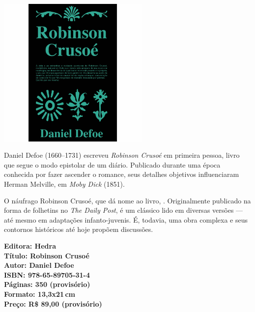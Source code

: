 \begin{center}
\hspace*{.5cm}\includegraphics[width=74mm]{./CAPAS/HEDRA_ROBINSON.jpg}
\end{center}
\hspace*{-7cm}\hrulefill\hspace*{-7cm}
\medskip

\noindent{}Daniel Defoe (1660--1731) escreveu \textit{Robinson Crusoé} em primeira pessoa, livro que segue o modo epistolar de um diário. Publicado durante uma época conhecida por fazer ascender o romance, seus detalhes objetivos influenciaram Herman Melville, em \textit{Moby Dick} (1851).

O náufrago Robinson Crusoé, que dá nome ao livro, . Originalmente publicado na forma de folhetins no \textit{The Daily Post}, é um clássico lido em diversas versões --- até mesmo em adaptações infanto-juvenis. É, todavia, uma obra complexa e seus contornos históricos até hoje propõem discussões. 

\vfill
\noindent\begin{minipage}[c]{1\linewidth}
{\small\textbf{
\hspace*{-.1cm}Editora: Hedra\\
Título: Robinson Crusoé\\
Autor: Daniel Defoe\\ 
ISBN: 978-65-89705-31-4\\
Páginas: 350 (provisório)\\
Formato: 13,3x21\,cm\\
Preço: R\$ 89,00 (provisório)\\
}}
\end{minipage}
\pagebreak

